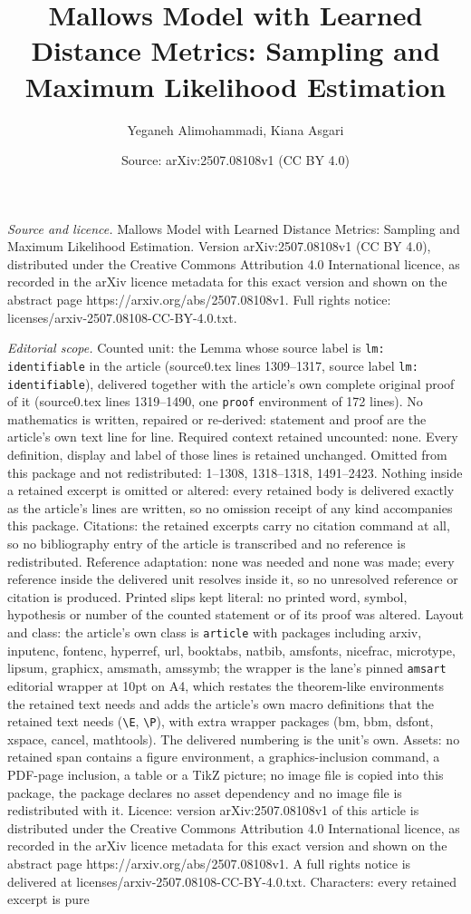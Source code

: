 \documentclass[10pt,a4paper]{amsart}
\title[Mallows Model with Learned Distance Metrics: Sampling and Ma]{Mallows Model with Learned Distance Metrics: Sampling and Maximum Likelihood Estimation}
\author{Yeganeh Alimohammadi, Kiana Asgari}
\date{Source: arXiv:2507.08108v1 (CC BY 4.0)}
\begin{document}
\maketitle

\noindent\emph{Source and licence.} Mallows Model with Learned Distance Metrics: Sampling and Maximum Likelihood Estimation. Version arXiv:2507.08108v1 (CC BY 4.0), distributed under the Creative Commons Attribution 4.0 International licence, as recorded in the arXiv licence metadata for this exact version and shown on the abstract page https://arxiv.org/abs/2507.08108v1. Full rights notice: licenses/arxiv-2507.08108-CC-BY-4.0.txt.\par\smallskip

\noindent\textit{Editorial scope.} Counted unit: the Lemma whose source label is \texttt{lm: identifiable} in the article (source0.tex lines 1309--1317, source label \texttt{lm: identifiable}), delivered together with the article's own complete original proof of it (source0.tex lines 1319--1490, one \texttt{proof} environment of 172 lines). No mathematics is written, repaired or re-derived: statement and proof are the article's own text line for line. Required context retained uncounted: none. Every definition, display and label of those lines is retained unchanged. Omitted from this package and not redistributed: 1--1308, 1318--1318, 1491--2423. Nothing inside a retained excerpt is omitted or altered: every retained body is delivered exactly as the article's lines are written, so no omission receipt of any kind accompanies this package. Citations: the retained excerpts carry no citation command at all, so no bibliography entry of the article is transcribed and no reference is redistributed. Reference adaptation: none was needed and none was made; every reference inside the delivered unit resolves inside it, so no unresolved reference or citation is produced. Printed slips kept literal: no printed word, symbol, hypothesis or number of the counted statement or of its proof was altered. Layout and class: the article's own class is \texttt{article} with packages including arxiv, inputenc, fontenc, hyperref, url, booktabs, natbib, amsfonts, nicefrac, microtype, lipsum, graphicx, amsmath, amssymb; the wrapper is the lane's pinned \texttt{amsart} editorial wrapper at 10pt on A4, which restates the theorem-like environments the retained text needs and adds the article's own macro definitions that the retained text needs (\texttt{\textbackslash E}, \texttt{\textbackslash P}), with extra wrapper packages (bm, bbm, dsfont, xspace, cancel, mathtools). The delivered numbering is the unit's own. Assets: no retained span contains a figure environment, a graphics-inclusion command, a PDF-page inclusion, a table or a TikZ picture; no image file is copied into this package, the package declares no asset dependency and no image file is redistributed with it. Licence: version arXiv:2507.08108v1 of this article is distributed under the Creative Commons Attribution 4.0 International licence, as recorded in the arXiv licence metadata for this exact version and shown on the abstract page https://arxiv.org/abs/2507.08108v1. A full rights notice is delivered at licenses/arxiv-2507.08108-CC-BY-4.0.txt. Characters: every retained excerpt is pure 
\end{document}
